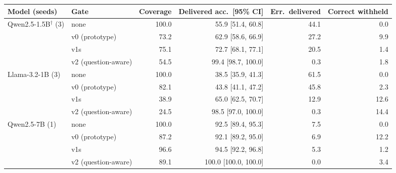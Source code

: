 \begin{tabular}{llrrrr}
\toprule
Model (seeds) & Gate & Coverage & Delivered acc.\ [95\% CI] & Err.\ delivered & Correct withheld \\
\midrule
Qwen2.5-1.5B$^\dagger$ (3) & none & 100.0 & 55.9 [51.4, 60.8] & 44.1 & 0.0 \\
 & v0 (prototype) & 73.2 & 62.9 [58.6, 66.9] & 27.2 & 9.9 \\
 & v1s & 75.1 & 72.7 [68.1, 77.1] & 20.5 & 1.4 \\
 & v2 (question-aware) & 54.5 & 99.4 [98.7, 100.0] & 0.3 & 1.8 \\
\midrule
Llama-3.2-1B (3) & none & 100.0 & 38.5 [35.9, 41.3] & 61.5 & 0.0 \\
 & v0 (prototype) & 82.1 & 43.8 [41.1, 47.2] & 45.8 & 2.3 \\
 & v1s & 38.9 & 65.0 [62.5, 70.7] & 12.9 & 12.6 \\
 & v2 (question-aware) & 24.5 & 98.5 [97.0, 100.0] & 0.3 & 14.4 \\
\midrule
Qwen2.5-7B (1) & none & 100.0 & 92.5 [89.4, 95.3] & 7.5 & 0.0 \\
 & v0 (prototype) & 87.2 & 92.1 [89.2, 95.0] & 6.9 & 12.2 \\
 & v1s & 96.6 & 94.5 [92.2, 96.8] & 5.3 & 1.2 \\
 & v2 (question-aware) & 89.1 & 100.0 [100.0, 100.0] & 0.0 & 3.4 \\
\bottomrule
\end{tabular}